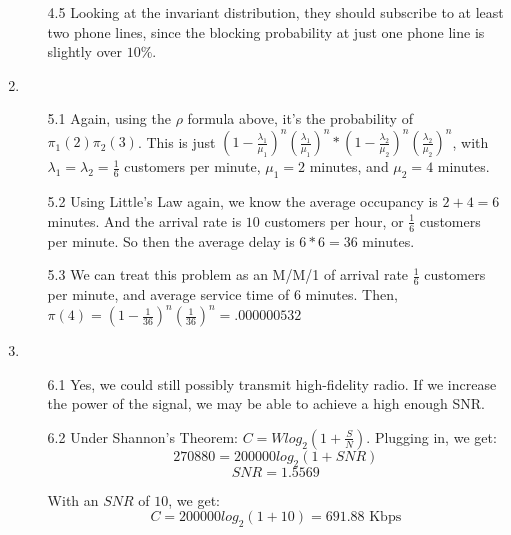 \begin{enumerate}
\begin{enumerate}
      \item [4.5] Looking at the invariant distribution, they should subscribe to at least two phone lines, since the blocking probability at just one phone line is slightly over $10\%$.
    \end{enumerate}

  \item 
    \begin{itemize}
      \item [5.1] Again, using the $\rho$ formula above, it's the probability of $\pi_1(2)\pi_2(3)$. This is just $(1-\frac{\lambda_1}{\mu_1})^n(\frac{\lambda_1}{\mu_1})^n * (1-\frac{\lambda_2}{\mu_2})^n(\frac{\lambda_2}{\mu_2})^n$, with $\lambda_1 = \lambda_2 = \frac{1}{6}$ customers per minute, $\mu_1 = 2$ minutes, and $\mu_2 = 4$ minutes.


      \item [5.2] Using Little's Law again, we know the average occupancy is $2+4 = 6$ minutes. And the arrival rate is $10$ customers per hour, or $\frac{1}{6}$ customers per minute. So then the average delay is $6*6 = 36$ minutes.

      \item [5.3] We can treat this problem as an M/M/1 of arrival rate $\frac{1}{6}$ customers per minute, and average service time of $6$ minutes. Then, $\pi(4) = (1-\frac{1}{36})^n(\frac{1}{36})^n = .000000532$
    \end{itemize}


  \item 
    \begin{itemize}
      \item [6.1] Yes, we could still possibly transmit high-fidelity radio. If we increase the power of the signal, we may be able to achieve a high enough SNR.

      \item [6.2] Under Shannon's Theorem: $C = Wlog_2(1 + \frac{S}{N})$. Plugging in, we get:
        $$270880 = 200000log_2(1 + SNR)$$
        $$SNR = 1.5569$$

        With an $SNR$ of $10$, we get:
        $$C = 200000log_2(1 + 10) = 691.88 \text{ Kbps}$$
    \end{itemize}
\end{enumerate}


